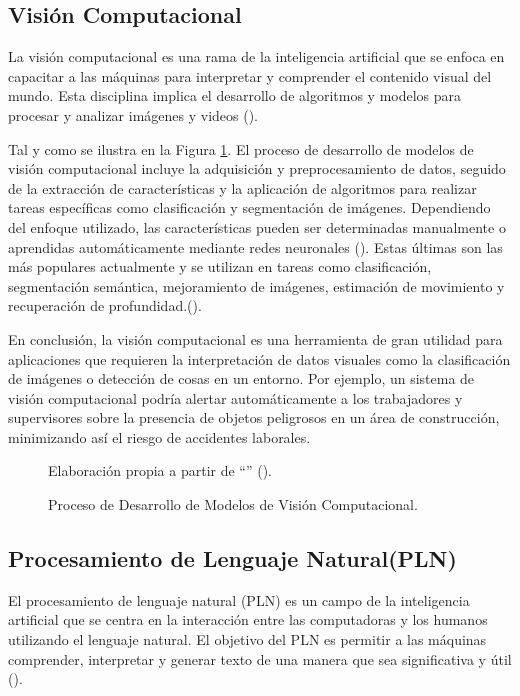 \subsection{Visión Computacional}
La visión computacional es una rama de la inteligencia artificial que se enfoca en capacitar a las máquinas para interpretar y comprender el contenido visual del mundo. Esta disciplina implica el desarrollo de algoritmos y modelos para procesar y analizar imágenes y videos (\cite{szeliski2022computer}).

Tal y como se ilustra en la Figura \ref{fig:computer_vision}.  El proceso de desarrollo de modelos de visión computacional incluye la adquisición y preprocesamiento de datos, seguido de la extracción de características y la aplicación de algoritmos para realizar tareas específicas como clasificación y segmentación de imágenes. Dependiendo del enfoque utilizado, las características pueden ser determinadas manualmente o aprendidas automáticamente mediante redes neuronales (\cite{goodfellow2016deep}). Estas últimas son las más populares actualmente y se utilizan en tareas como clasificación, segmentación semántica, mejoramiento de imágenes, estimación de movimiento y recuperación de profundidad.(\cite{szeliski2022computer}).

En conclusión, la visión computacional es una herramienta de gran utilidad para aplicaciones que requieren la interpretación de datos visuales como la clasificación de imágenes o detección de cosas en un entorno. Por ejemplo, un sistema de visión computacional podría alertar automáticamente a los trabajadores y supervisores sobre la presencia de objetos peligrosos en un área de construcción, minimizando así el riesgo de accidentes laborales.

\begin{figure}[htb]
	\centering
    
	\caption{Proceso de Desarrollo de Modelos de Visión Computacional.}
	\footnotesize{{Elaboración propia a partir de ``\textit{}'' (\citeyear{szeliski2022computer}).}}
	\label{fig:computer_vision} 
\end{figure}

\subsection{Procesamiento de Lenguaje Natural(PLN)}
El procesamiento de lenguaje natural (PLN) es un campo de la inteligencia artificial que se centra en la interacción entre las computadoras y los humanos utilizando el lenguaje natural. El objetivo del PLN es permitir a las máquinas comprender, interpretar y generar texto de una manera que sea significativa y útil (\cite{jurafsky2000speech}).

